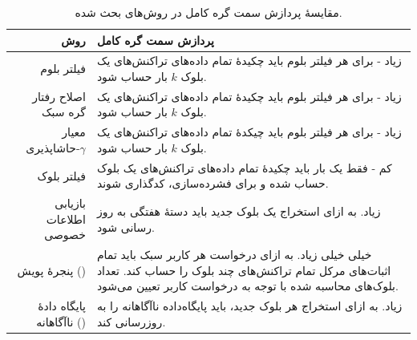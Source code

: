 \begin{xltabular}{\textwidth}{|r|X|}
	\caption{
		مقایسهٔ پردازش سمت گره کامل در روش‌های بحث شده.
		\label{table:ProcCmp}}\\
	\hline
	\textbf{روش} & \textbf{پردازش سمت گره کامل} \\
	\hline 
	{%
		فیلتر بلوم \cite{Hearn2013}
	} & {%
		زیاد - برای هر فیلتر بلوم باید چکیدهٔ تمام داده‌های تراکنش‌های یک بلوک $k$ بار حساب شود. 
	} \\
	\hline
	{%
		اصلاح رفتار گره سبک \cite{Gervais2014}
	} & {%
		زیاد - برای هر فیلتر بلوم باید چکیدهٔ تمام داده‌های تراکنش‌های یک بلوک $k$ بار حساب شود.
	}\\
	\hline
	{%
		معیار حاشاپذیری-$\gamma$ \cite{Kanemura2017}
	} & {%
		زیاد - برای هر فیلتر بلوم باید چیکدهٔ تمام داده‌های تراکنش‌های یک بلوک $k$ بار حساب شود.
	}\\
	\hline
	{%
		فیلتر بلوک \cite{Osuntokun2017}
	} & {%
		کم - فقط یک بار باید چکیدهٔ تمام داده‌های تراکنش‌های یک بلوک حساب شده و برای فشرده‌سازی، کدگذاری شوند.
	}\\
	\hline
	{%
		بازیابی اطلاعات خصوصی \cite{Qin2019}
	} & {%
		زیاد. به ازای استخراج یک بلوک جدید باید دستهٔ هفتگی به روز رسانی شود.
	}\\
	\hline
	{%
		پنجرهٔ پویش () \cite{Matetic2019}
	} & {%
		خیلی خیلی زیاد. به ازای درخواست هر کاربر سبک باید تمام اثبات‌های مرکل تمام تراکنش‌های چند بلوک را حساب کند. تعداد بلوک‌های محاسبه شده با توجه به درخواست کاربر تعیین می‌شود.
	}\\
	\hline
	{%
		پایگاه دادهٔ ناآگاهانه () \cite{Matetic2019}
	} & {%
		زیاد. به ازای استخراج هر بلوک جدید، باید پایگاه‌داده ناآگاهانه را به روزرسانی کند.
	}\\
	\hline	
\end{xltabular}

